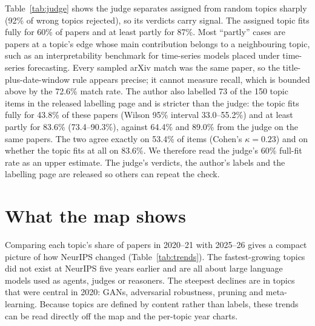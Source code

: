 \documentclass{article}
\begin{document}
Table~\ref{tab:judge} shows the judge separates assigned from random topics sharply (92\% of wrong topics rejected), so its verdicts carry signal. The assigned topic fits fully for 60\% of papers and at least partly for 87\%. Most ``partly'' cases are papers at a topic's edge whose main contribution belongs to a neighbouring topic, such as an interpretability benchmark for time-series models placed under time-series forecasting. Every sampled arXiv match was the same paper, so the title-plus-date-window rule appears precise; it cannot measure recall, which is bounded above by the 72.6\% match rate. The author also labelled 73 of the 150 topic items in the released labelling page and is stricter than the judge: the topic fits fully for 43.8\% of these papers (Wilson 95\% interval 33.0--55.2\%) and at least partly for 83.6\% (73.4--90.3\%), against 64.4\% and 89.0\% from the judge on the same papers. The two agree exactly on 53.4\% of items (Cohen's $\kappa = 0.23$) and on whether the topic fits at all on 83.6\%. We therefore read the judge's 60\% full-fit rate as an upper estimate. The judge's verdicts, the author's labels and the labelling page are released so others can repeat the check.

\FloatBarrier
\section{What the map shows}
Comparing each topic's share of papers in 2020--21 with 2025--26 gives a compact picture of how NeurIPS changed (Table~\ref{tab:trends}). The fastest-growing topics did not exist at NeurIPS five years earlier and are all about large language models used as agents, judges or reasoners. The steepest declines are in topics that were central in 2020: GANs, adversarial robustness, pruning and meta-learning. Because topics are defined by content rather than labels, these trends can be read directly off the map and the per-topic year charts.
\end{document}
